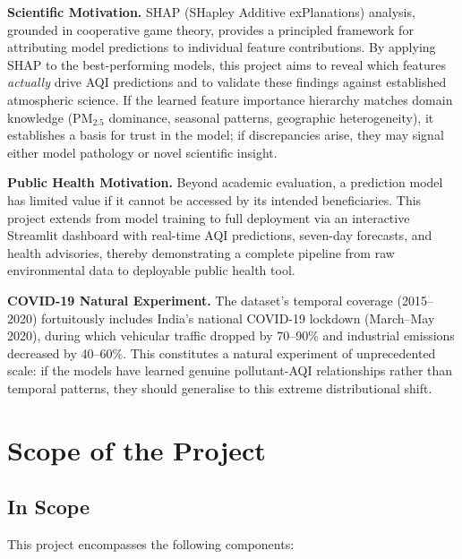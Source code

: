 \documentclass[12pt,a4paper]{report}
\begin{document}
\textbf{Scientific Motivation.} SHAP (SHapley Additive exPlanations) analysis, grounded in cooperative game theory, provides a principled framework for attributing model predictions to individual feature contributions. By applying SHAP to the best-performing models, this project aims to reveal which features \textit{actually} drive AQI predictions and to validate these findings against established atmospheric science. If the learned feature importance hierarchy matches domain knowledge (PM$_{2.5}$ dominance, seasonal patterns, geographic heterogeneity), it establishes a basis for trust in the model; if discrepancies arise, they may signal either model pathology or novel scientific insight.

\textbf{Public Health Motivation.} Beyond academic evaluation, a prediction model has limited value if it cannot be accessed by its intended beneficiaries. This project extends from model training to full deployment via an interactive Streamlit dashboard with real-time AQI predictions, seven-day forecasts, and health advisories, thereby demonstrating a complete pipeline from raw environmental data to deployable public health tool.

\textbf{COVID-19 Natural Experiment.} The dataset's temporal coverage (2015--2020) fortuitously includes India's national COVID-19 lockdown (March--May 2020), during which vehicular traffic dropped by 70--90\% and industrial emissions decreased by 40--60\%. This constitutes a natural experiment of unprecedented scale: if the models have learned genuine pollutant-AQI relationships rather than temporal patterns, they should generalise to this extreme distributional shift.

\section{Scope of the Project}

\subsection{In Scope}

This project encompasses the following components:
\end{document}
